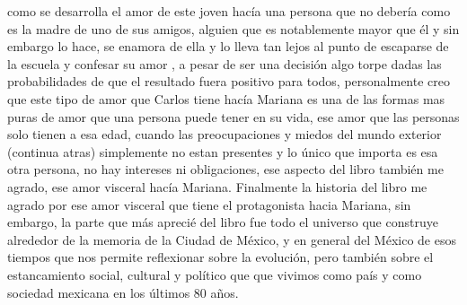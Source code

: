 \documentclass[12pt]{article}
\begin{document}
como se desarrolla el amor de este joven hacía una persona que no debería como es la madre de uno de
sus amigos, alguien que es notablemente mayor que él y sin embargo lo hace, se enamora de ella y lo
lleva tan lejos al punto de escaparse de la escuela y confesar su amor ,
a pesar de ser una decisión algo torpe dadas las probabilidades de que el resultado fuera positivo
para todos, personalmente creo que este tipo de amor que Carlos tiene hacía Mariana es una de las
formas mas puras de amor que una persona puede tener en su vida, ese amor que las personas solo
tienen a esa edad, cuando las preocupaciones y miedos del mundo exterior 
{\footnotesize (continua atras)}
\newpage 
simplemente no estan presentes y lo
único que importa es esa otra persona, no hay intereses ni obligaciones, ese aspecto del libro
también me agrado, ese amor visceral hacía Mariana. Finalmente la historia del libro me agrado por
ese amor visceral que tiene el protagonista hacia Mariana, sin embargo, la parte que más aprecié del libro fue
todo el universo que construye alrededor de la memoria de la Ciudad de México, y en general del
México de esos tiempos que nos permite reflexionar sobre la evolución,  pero también sobre
el estancamiento social, cultural y político que que vivimos como país y como sociedad mexicana en los últimos 80 años.
\end{document}
